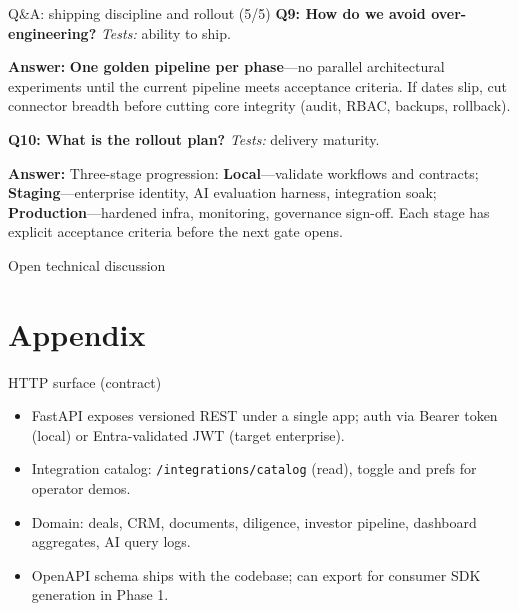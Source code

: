 \documentclass[aspectratio=169,11pt]{beamer}
\begin{document}
\begin{frame}{Q\&A: shipping discipline and rollout (5/5)}
  \footnotesize
  \textbf{Q9: How do we avoid over-engineering?}
  \textit{Tests:} ability to ship.

  \textbf{Answer:} \textbf{One golden pipeline per phase}---no parallel architectural experiments until the current pipeline meets acceptance criteria. If dates slip, cut connector breadth before cutting core integrity (audit, RBAC, backups, rollback).

  \vspace{0.4em}
  \textbf{Q10: What is the rollout plan?}
  \textit{Tests:} delivery maturity.

  \textbf{Answer:} Three-stage progression: \textbf{Local}---validate workflows and contracts; \textbf{Staging}---enterprise identity, AI evaluation harness, integration soak; \textbf{Production}---hardened infra, monitoring, governance sign-off. Each stage has explicit acceptance criteria before the next gate opens.

  \vspace{0.5em}
  \centering
  \normalsize Open technical discussion
\end{frame}

\appendix

\section*{Appendix}

\begin{frame}{HTTP surface (contract)}
  \small
  \begin{itemize}
    \item FastAPI exposes versioned REST under a single app; auth via Bearer token (local) or Entra-validated JWT (target enterprise).
    \item Integration catalog: \texttt{/integrations/catalog} (read), toggle and prefs for operator demos.
    \item Domain: deals, CRM, documents, diligence, investor pipeline, dashboard aggregates, AI query logs.
    \item OpenAPI schema ships with the codebase; can export for consumer SDK generation in Phase 1.
  \end{itemize}
\end{frame}
\end{document}
